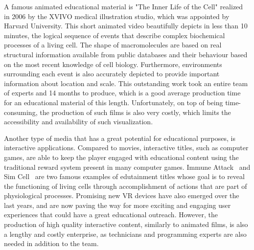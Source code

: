 A famous animated educational material is "The Inner Life of the Cell" \cite{inner2006} realized in 2006 by the XVIVO medical illustration studio, which was appointed by Harvard University.
This short animated video beautifully depicts in less than 10 minutes, the logical sequence of events that describe complex biochemical processes of a living cell.
The shape of macromolecules are based on real structural information available from public databases and their behaviour based on the most recent knowledge of cell biology.
Furthermore, environments surrounding each event is also accurately depicted to provide important information about location and scale.
This outstanding work took an entire team of experts and 14 months to produce, which is a good average production time for an educational material of this length.
Unfortunately, on top of being time-consuming, the production of such films is also very costly, which limits the accessibility and availability of such visualization.

Another type of media that has a great potential for educational purposes, is interactive applications.
Compared to movies, interactive titles, such as computer games, are able to keep the player engaged with educational content using the traditional reward system present in many computer games.
Immune Attack~\cite{immune2008} and Sim Cell~\cite{simcell2013} are two famous examples of edutainment titles whose goal is to reveal the functioning of living cells through accomplishment of actions that are part of physiological processes.
Promising new VR devices have also emerged over the last years, and are now paving the way for more exciting and engaging user experiences that could have a great educational outreach.
However, the production of high quality interactive content, similarly to animated films, is also a lengthy and costly enterprise, as technicians and programming experts are also needed in addition to the team.

